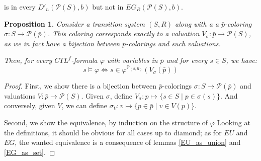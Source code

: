 \documentclass[11pt]{article}
\newtheorem{proposition}[definition]{Proposition}
\begin{document}
\begin{center} 
\end{center}
is in every $D'_n(\mathcal{P}(S),b)$ but not in $EG_R(\mathcal{P}(S),b)$.

\begin{proposition}\label{equiv_complex_alg}
    Consider a transition system $(S,R)$ along with a a $\bar{p}$-coloring $\sigma : S \to \mathcal{P}(\bar{p})$. This coloring corresponds exactly to a valuation $V_\sigma:\bar{p}\to \mathcal{P}(S)$, as we in fact have a bijection between $\bar{p}$-colorings and such valuations.

    Then, for every $CTL^f$-formula $\varphi$ with variables in $\bar{p}$ and for every $s\in S$, we have: \[s\models\varphi \Longleftrightarrow s\in\varphi^{\mathbb{P}_{(S,R)}}(V_\sigma(\bar{p}))\]
\end{proposition}

\begin{proof}
    First, we show there is a bijection between $\bar{p}$-colorings $\sigma:S \to \mathcal{P}(\bar{p})$ and valuations $V:\bar{p}\to \mathcal{P}(S)$. Given $\sigma$, define $V_\sigma: p\mapsto\{s\in S \mid p\in \sigma(s)\}$. And conversely, given $V$, we can define $\sigma_V: v\mapsto\{p\in\bar{p}\mid v\in V(p)\}$.

    Second, we show the equivalence, by induction on the structure of $\varphi$ Looking at the definitions, it should be obvious for all cases up to diamond; as for $EU$ and $EG$, the wanted equivalence is a consequence of lemmas \ref{EU_as_union} and \ref{EG_as_set}.
\end{proof}
\end{document}
